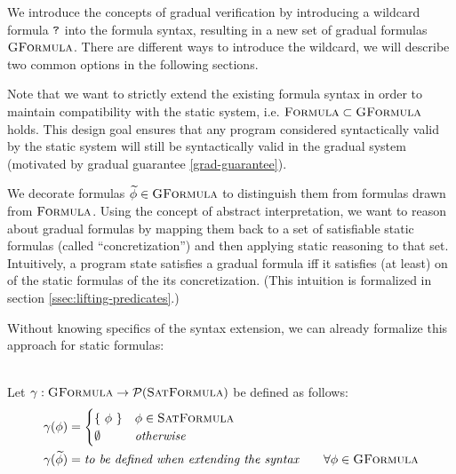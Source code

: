 
We introduce the concepts of gradual verification by introducing a wildcard formula $\texttt{?}$ into the formula syntax, resulting in a new set of gradual formulas $\textsc{GFormula}$.
There are different ways to introduce the wildcard, we will describe two common options in the following sections.

Note that we want to strictly extend the existing formula syntax in order to maintain compatibility with the static system, i.e. $\textsc{Formula} \subset \textsc{GFormula}$ holds.
This design goal ensures that any program considered syntactically valid by the static system will still be syntactically valid in the gradual system (motivated by gradual guarantee \ref{grad-guarantee}).

We decorate formulas $\widetilde{\phi} \in \textsc{GFormula}$ to distinguish them from formulas drawn from $\textsc{Formula}$.
Using the concept of abstract interpretation, we want to reason about gradual formulas by mapping them back to a set of satisfiable static formulas (called “concretization”) and then applying static reasoning to that set.
Intuitively, a program state satisfies a gradual formula iff it satisfies (at least) on of the static formulas of the its concretization.
(This intuition is formalized in section \ref{ssec:lifting-predicates}.)


Without knowing specifics of the syntax extension, we can already formalize this approach for static formulas:
\begin{definition}[Concretization]~\\
    Let $\gamma : \textsc{GFormula} \rightarrow \mathcal{P}(\textsc{SatFormula})$ be defined as follows:
    \begin{align*}
    &\gamma(\phi) = 
        \begin{cases}
        \{~ \phi ~\}  & \phi \in \textsc{SatFormula}\\
        \emptyset     & \textit{otherwise}
        \end{cases}\\
    &\gamma(\widetilde{\phi}) = \textit{to be defined when extending the syntax}     \quad\quad \forall \phi \in \textsc{GFormula}\\
    \end{align*}
\end{definition}

